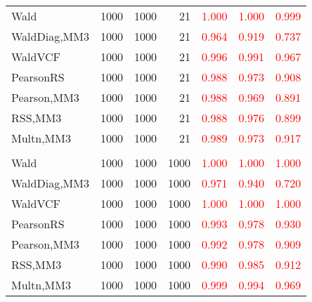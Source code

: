 \documentclass[
]{article}
\begin{document}
\begin{table}[H]
{\begin{tabular}[t]{lrrrrrr}
\hspace{1em}Wald & 1000 & 1000 & 21 & \textcolor{red}{1.000} & \textcolor{red}{1.000} & \textcolor{red}{0.999}\\
\hspace{1em}WaldDiag,MM3 & 1000 & 1000 & 21 & \textcolor{red}{0.964} & \textcolor{red}{0.919} & \textcolor{red}{0.737}\\
\hspace{1em}WaldVCF & 1000 & 1000 & 21 & \textcolor{red}{0.996} & \textcolor{red}{0.991} & \textcolor{red}{0.967}\\
\hspace{1em}PearsonRS & 1000 & 1000 & 21 & \textcolor{red}{0.988} & \textcolor{red}{0.973} & \textcolor{red}{0.908}\\
\hspace{1em}Pearson,MM3 & 1000 & 1000 & 21 & \textcolor{red}{0.988} & \textcolor{red}{0.969} & \textcolor{red}{0.891}\\
\hspace{1em}RSS,MM3 & 1000 & 1000 & 21 & \textcolor{red}{0.988} & \textcolor{red}{0.976} & \textcolor{red}{0.899}\\
\hspace{1em}Multn,MM3 & 1000 & 1000 & 21 & \textcolor{red}{0.989} & \textcolor{red}{0.973} & \textcolor{red}{0.917}\\
\addlinespace[0.3em]
\multicolumn{7}{l}{\textbf{3F 15V}}\\
\hspace{1em}Wald & 1000 & 1000 & 1000 & \textcolor{red}{1.000} & \textcolor{red}{1.000} & \textcolor{red}{1.000}\\
\hspace{1em}WaldDiag,MM3 & 1000 & 1000 & 1000 & \textcolor{red}{0.971} & \textcolor{red}{0.940} & \textcolor{red}{0.720}\\
\hspace{1em}WaldVCF & 1000 & 1000 & 1000 & \textcolor{red}{1.000} & \textcolor{red}{1.000} & \textcolor{red}{1.000}\\
\hspace{1em}PearsonRS & 1000 & 1000 & 1000 & \textcolor{red}{0.993} & \textcolor{red}{0.978} & \textcolor{red}{0.930}\\
\hspace{1em}Pearson,MM3 & 1000 & 1000 & 1000 & \textcolor{red}{0.992} & \textcolor{red}{0.978} & \textcolor{red}{0.909}\\
\hspace{1em}RSS,MM3 & 1000 & 1000 & 1000 & \textcolor{red}{0.990} & \textcolor{red}{0.985} & \textcolor{red}{0.912}\\
\hspace{1em}Multn,MM3 & 1000 & 1000 & 1000 & \textcolor{red}{0.999} & \textcolor{red}{0.994} & \textcolor{red}{0.969}\\
\bottomrule
\end{tabular}}
\endgroup{}
\end{table}
\end{document}
